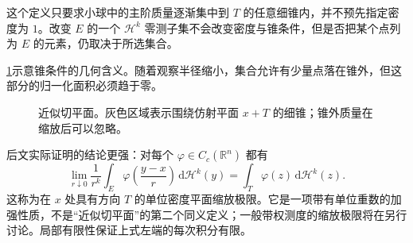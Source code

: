 这个定义只要求小球中的主阶质量逐渐集中到 \(T\) 的任意细锥内，并不预先指定密度为 \(1\)。改变 \(E\) 的一个 \(\mathcal H^k\) 零测子集不会改变密度与锥条件，但是否把某个点列为 \(E\) 的元素，仍取决于所选集合。

\ProseParagraphBreak

\cref{b1:fig:approximate-tangent-cone}示意锥条件的几何含义。随着观察半径缩小，集合允许有少量点落在锥外，但这部分的归一化面积必须趋于零。
\begin{figure}[htbp]
  \centering
  \caption[近似切平面]{近似切平面。灰色区域表示围绕仿射平面 \(x+T\) 的细锥；锥外质量在缩放后可以忽略。}
  \label{b1:fig:approximate-tangent-cone}
\end{figure}

后文实际证明的结论更强：对每个 \(\varphi\in C_c(\mathbb R^n)\) 都有
\begin{equation}\label{b1:eq:approximate-tangent-blowup}
 \lim_{r\downarrow0}\frac1{r^k}
 \int_E\varphi\left(\frac{y-x}{r}\right)\,\mathrm d\mathcal H^k(y)
 =\int_T\varphi(z)\,\mathrm d\mathcal H^k(z).
\end{equation}
这称为在 \(x\) 处具有方向 \(T\) 的单位密度平面缩放极限。它是一项带有单位重数的加强性质，不是“近似切平面”的第二个同义定义；一般带权测度的缩放极限将在另行讨论。局部有限性保证上式左端的每次积分有限。

